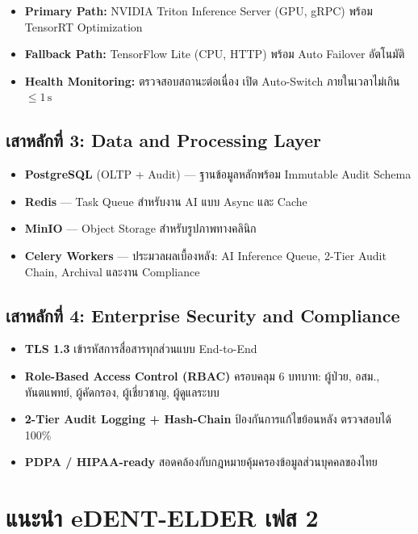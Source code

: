 \begin{itemize}[leftmargin=1.8em, itemsep=3pt]
  \item \textbf{Primary Path:} NVIDIA Triton Inference Server (GPU, gRPC)
        พร้อม TensorRT Optimization
  \item \textbf{Fallback Path:} TensorFlow Lite (CPU, HTTP)
        พร้อม Auto Failover อัตโนมัติ
  \item \textbf{Health Monitoring:} ตรวจสอบสถานะต่อเนื่อง
      เปิด Auto-Switch ภายในเวลาไม่เกิน $\leq 1\,\text{s}$
\end{itemize}

\subsection{เสาหลักที่ 3: Data and Processing Layer}

\begin{itemize}[leftmargin=1.8em, itemsep=3pt]
  \item \textbf{PostgreSQL} (OLTP + Audit) --- ฐานข้อมูลหลักพร้อม Immutable Audit Schema
  \item \textbf{Redis} --- Task Queue สำหรับงาน AI แบบ Async และ Cache
  \item \textbf{MinIO} --- Object Storage สำหรับรูปภาพทางคลินิก
  \item \textbf{Celery Workers} --- ประมวลผลเบื้องหลัง: AI Inference Queue,
        2-Tier Audit Chain, Archival และงาน Compliance
\end{itemize}

\subsection{เสาหลักที่ 4: Enterprise Security and Compliance}

\begin{itemize}[leftmargin=1.8em, itemsep=3pt]
  \item \textbf{TLS 1.3} เข้ารหัสการสื่อสารทุกส่วนแบบ End-to-End
  \item \textbf{Role-Based Access Control (RBAC)} ครอบคลุม 6 บทบาท:
        ผู้ป่วย, อสม., ทันตแพทย์, ผู้คัดกรอง, ผู้เชี่ยวชาญ, ผู้ดูแลระบบ
  \item \textbf{2-Tier Audit Logging + Hash-Chain} ป้องกันการแก้ไขย้อนหลัง
        ตรวจสอบได้ 100\%
  \item \textbf{PDPA / HIPAA-ready} สอดคล้องกับกฎหมายคุ้มครองข้อมูลส่วนบุคคลของไทย
\end{itemize}

\section{แนะนำ eDENT-ELDER เฟส 2}

